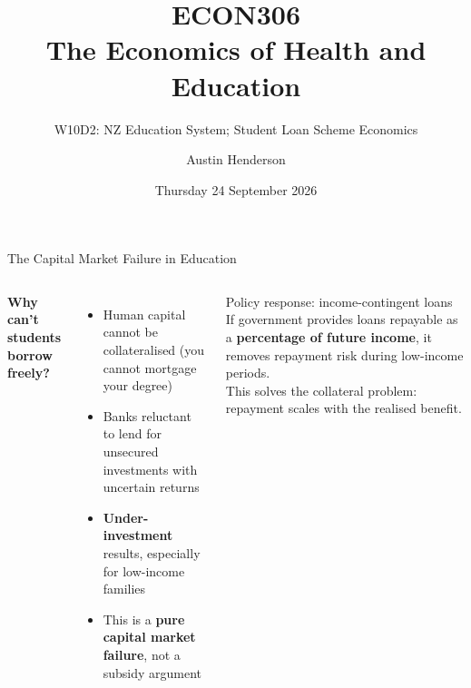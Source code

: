 \documentclass[aspectratio=169, 12pt]{beamer}
\title[ECON306: W10D2 — NZ Education and Student Loans]{ECON306\\The Economics of Health and Education}
\subtitle{W10D2: NZ Education System; Student Loan Scheme Economics}
\author{Austin Henderson}
\institute{Department of Economics\\University of Otago}
\date{Thursday 24 September 2026}
\begin{document}
\begin{frame}[plain]
  \titlepage
\end{frame}



\begin{frame}{The Capital Market Failure in Education}
  \begin{columns}
      \footnotesize \textbf{Why can't students borrow freely?}
      \begin{itemize}
        \item Human capital cannot be collateralised (you cannot mortgage your degree)
        \item Banks reluctant to lend for unsecured investments with uncertain returns
        \item \textbf{Under-investment} results, especially for low-income families
        \item This is a \textbf{pure capital market failure}, not a subsidy argument
      \end{itemize}
      \begin{alertblock}{Policy response: income-contingent loans}
        \footnotesize
        If government provides loans repayable as a \textbf{percentage of future income},
        it removes repayment risk during low-income periods.\\[0.3em]
        This solves the collateral problem: repayment scales with the realised benefit.
      \end{alertblock}
  \end{columns}
\end{frame}
\end{document}
